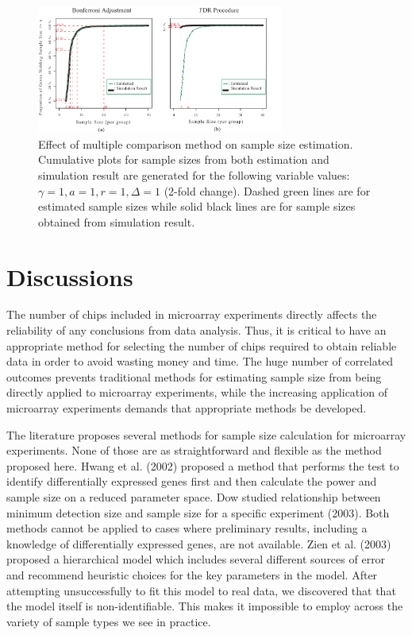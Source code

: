 \documentclass{bioinfo}
\begin{document}
\begin{figure}[h]
  \centerline{\includegraphics*[width=3.2in]{ResMtd.pdf}}
  \caption[Effect of multiple comparison method on sample size estimation]
  {Effect of multiple comparison method on sample size estimation.
    Cumulative plots for sample sizes from both estimation and
    simulation result are generated for the following variable values: $\gamma = 1, a = 1, r = 1,
    \Delta = 1$ (2-fold change). Dashed green lines are for estimated sample sizes
    while solid black lines are for sample sizes obtained from simulation result.}
  \label{fig:ResMtd}
\end{figure}

\section{Discussions}

The number of chips included in microarray experiments directly
affects the reliability of any conclusions from data analysis.
Thus, it is critical to have an appropriate method for selecting
the number of chips required to obtain reliable data in order to
avoid wasting money and time. The huge number of correlated
outcomes prevents traditional methods for estimating sample size
from being directly applied to microarray experiments, while the
increasing application of microarray experiments demands that
appropriate methods be developed.

The literature proposes several methods for sample size
calculation for microarray experiments. None of those are as
straightforward and flexible as the method proposed here. Hwang et
al. (2002) proposed a method that performs the test to identify
differentially expressed genes first and then calculate the power
and sample size on a reduced parameter space. Dow studied
relationship between minimum detection size and sample size for a
specific experiment (2003). Both methods cannot be applied to
cases where preliminary results, including a knowledge of
differentially expressed genes, are not available. Zien et al.
(2003) proposed a hierarchical model which includes several
different sources of error and recommend heuristic choices for the
key parameters in the model.  After attempting unsuccessfully to
fit this model to real data, we discovered that that the model
itself is non-identifiable.  This makes it impossible to employ
across the variety of sample types we see in practice.
\end{document}
